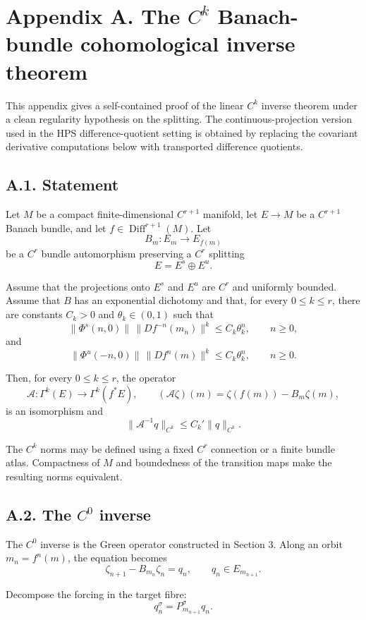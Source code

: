 \documentclass[12pt,a4paper]{article}
\theoremstyle{plain}
\numberwithin{equation}{section}
\numberwithin{theorem}{section}
\begin{document}
\section{Appendix A. The $C^k$ Banach-bundle cohomological inverse theorem}

This appendix gives a self-contained proof of the linear $C^k$ inverse theorem under a clean regularity hypothesis on the splitting. 
The continuous-projection version used in the HPS difference-quotient setting is obtained by replacing the covariant derivative computations below with transported difference quotients.

\subsection{A.1. Statement}

Let $M$ be a compact finite-dimensional $C^{r+1}$ manifold, let $E\to M$ be a $C^{r+1}$ Banach bundle, and let $f\in\operatorname{Diff}^{r+1}(M)$. Let
\[
B_m:E_m\to E_{f(m)}
\]
be a $C^r$ bundle automorphism preserving a $C^r$ splitting
\[
E=E^s\oplus E^u.
\]

Assume that the projections onto $E^s$ and $E^u$ are $C^r$ and uniformly bounded. Assume that $B$ has an exponential dichotomy and that, for every $0\le k\le r$, there are constants $C_k>0$ and $\theta_k\in(0,1)$ such that
\[
\|\Phi^s(n,0)\|\,\|Df^{-n}(m_n)\|^k
\le
C_k\theta_k^n,
\qquad n\ge0,
\]
and
\[
\|\Phi^u(-n,0)\|\,\|Df^n(m)\|^k
\le
C_k\theta_k^n,
\qquad n\ge0.
\]

Then, for every $0\le k\le r$, the operator
\[
\mathcal A:\Gamma^k(E)\to\Gamma^k(f^*E),
\qquad
(\mathcal A\zeta)(m)=\zeta(f(m))-B_m\zeta(m),
\]
is an isomorphism and
\[
\|\mathcal A^{-1}q\|_{C^k}
\le
C_k'\|q\|_{C^k}.
\]

The $C^k$ norms may be defined using a fixed $C^r$ connection or a finite bundle atlas. Compactness of $M$ and boundedness of the transition maps make the resulting norms equivalent.

\subsection{A.2. The $C^0$ inverse}

The $C^0$ inverse is the Green operator constructed in Section 3. Along an orbit $m_n=f^n(m)$, the equation becomes
\[
\zeta_{n+1}-B_{m_n}\zeta_n=q_n,
\qquad q_n\in E_{m_{n+1}}.
\]

Decompose the forcing in the target fibre:
\[
q_n^\sigma=P_{m_{n+1}}^\sigma q_n.
\]
\end{document}
